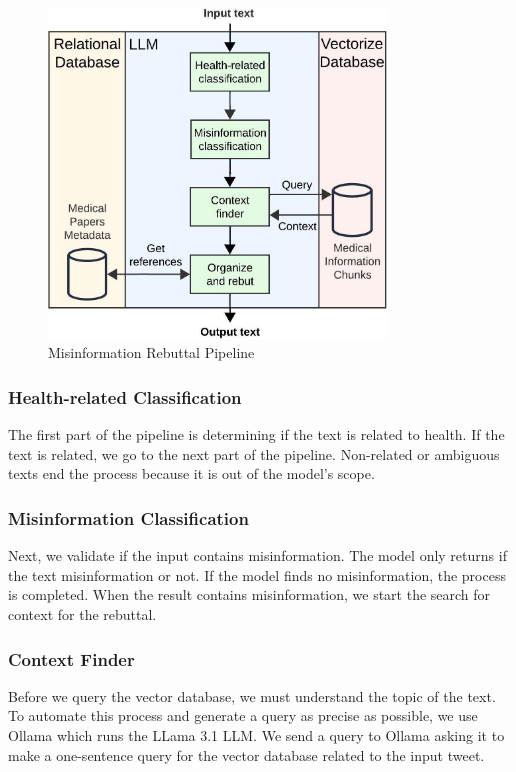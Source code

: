 \begin{figure}[!htb]
	\begin{center}
		\includegraphics[width=0.8\textwidth]{figures/LLM_Pipeline.jpeg} %
	\end{center}
	\caption{Misinformation Rebuttal Pipeline} %
	\label{fig:llm}
\end{figure}


\subsubsection{Health-related Classification}
The first part of the pipeline is determining if the text is related to health. If the text is related, we go to the next part of the pipeline. Non-related or ambiguous texts end the process because it is out of the model's scope. 

\subsubsection{Misinformation Classification}
Next, we validate if the input contains misinformation. The model  only returns if the text misinformation or not. If the model finds no misinformation, the process is completed. When the result contains misinformation, we start the search for context for the rebuttal.

\subsubsection{Context Finder}
Before we  query the vector database, we must understand the topic of the text. To automate this process and generate a query as precise as possible, we use Ollama \cite{ollama} which runs the LLama 3.1 LLM. We send a query to Ollama asking it to make a one-sentence query for the vector database related to the input tweet.

